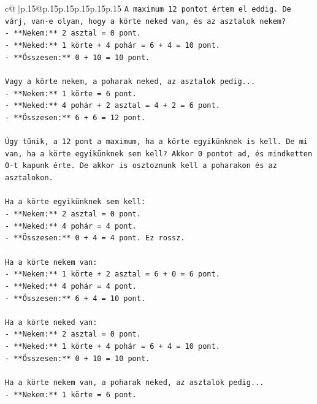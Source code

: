 \documentclass{article}
\begin{document}
{\begin{supertabular}{c@{$\;$}|p{.15\linewidth}@{}p{.15\linewidth}p{.15\linewidth}p{.15\linewidth}p{.15\linewidth}p{.15\linewidth}}
{{{\texttt{A maximum 12 pontot értem el eddig. De várj, van{-}e olyan, hogy a körte neked van, és az asztalok nekem?} \\
\texttt{{-} **Nekem:** 2 asztal = 0 pont.} \\
\texttt{{-} **Neked:** 1 körte + 4 pohár = 6 + 4 = 10 pont.} \\
\texttt{{-} **Összesen:** 0 + 10 = 10 pont.} \\
\\ 
\texttt{Vagy a körte nekem, a poharak neked, az asztalok pedig...} \\
\texttt{{-} **Nekem:** 1 körte = 6 pont.} \\
\texttt{{-} **Neked:** 4 pohár + 2 asztal = 4 + 2 = 6 pont.} \\
\texttt{{-} **Összesen:** 6 + 6 = 12 pont.} \\
\\ 
\texttt{Úgy tűnik, a 12 pont a maximum, ha a körte egyikünknek is kell. De mi van, ha a körte egyikünknek sem kell? Akkor 0 pontot ad, és mindketten 0{-}t kapunk érte. De akkor is osztoznunk kell a poharakon és az asztalokon.} \\
\\ 
\texttt{Ha a körte egyikünknek sem kell:} \\
\texttt{{-} **Nekem:** 2 asztal = 0 pont.} \\
\texttt{{-} **Neked:** 4 pohár = 4 pont.} \\
\texttt{{-} **Összesen:** 0 + 4 = 4 pont. Ez rossz.} \\
\\ 
\texttt{Ha a körte nekem van:} \\
\texttt{{-} **Nekem:** 1 körte + 2 asztal = 6 + 0 = 6 pont.} \\
\texttt{{-} **Neked:** 4 pohár = 4 pont.} \\
\texttt{{-} **Összesen:** 6 + 4 = 10 pont.} \\
\\ 
\texttt{Ha a körte neked van:} \\
\texttt{{-} **Nekem:** 2 asztal = 0 pont.} \\
\texttt{{-} **Neked:** 1 körte + 4 pohár = 6 + 4 = 10 pont.} \\
\texttt{{-} **Összesen:** 0 + 10 = 10 pont.} \\
\\ 
\texttt{Ha a körte nekem van, a poharak neked, az asztalok pedig...} \\
\texttt{{-} **Nekem:** 1 körte = 6 pont.} \\
}}}
\end{supertabular}}
\end{document}
